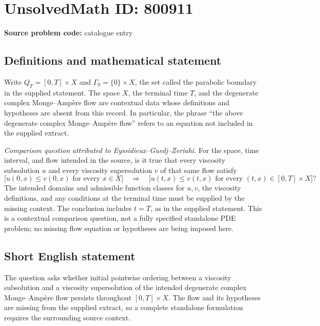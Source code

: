 \documentclass[11pt]{article}
\begin{document}
\section*{UnsolvedMath ID: 800911}
\textbf{Source problem code:} catalogue entry
\subsection{Definitions and mathematical statement}
Write \(Q_T=[0,T]\times X\) and \(\Gamma_0=\{0\}\times X\), the set called the parabolic boundary in the supplied statement. The space \(X\), the terminal time \(T\), and the degenerate complex Monge--Amp\`ere flow are contextual data whose definitions and hypotheses are absent from this record. In particular, the phrase ``the above degenerate complex Monge--Amp\`ere flow'' refers to an equation not included in the supplied extract.

\emph{Comparison question attributed to Eyssidieux--Guedj--Zeriahi.} For the space, time interval, and flow intended in the source, is it true that every viscosity subsolution \(u\) and every viscosity supersolution \(v\) of that same flow satisfy
\[
\bigl[u(0,x)\leq v(0,x)\text{ for every }x\in X\bigr]
\quad\Longrightarrow\quad
\bigl[u(t,x)\leq v(t,x)\text{ for every }(t,x)\in[0,T]\times X\bigr]?
\]
The intended domains and admissible function classes for \(u,v\), the viscosity definitions, and any conditions at the terminal time must be supplied by the missing context. The conclusion includes \(t=T\), as in the supplied statement. This is a contextual comparison question, not a fully specified standalone PDE problem; no missing flow equation or hypotheses are being imposed here.
\subsection{Short English statement}
The question asks whether initial pointwise ordering between a viscosity subsolution and a viscosity supersolution of the intended degenerate complex Monge--Amp\`ere flow persists throughout \([0,T]\times X\). The flow and its hypotheses are missing from the supplied extract, so a complete standalone formulation requires the surrounding source context.
\end{document}
